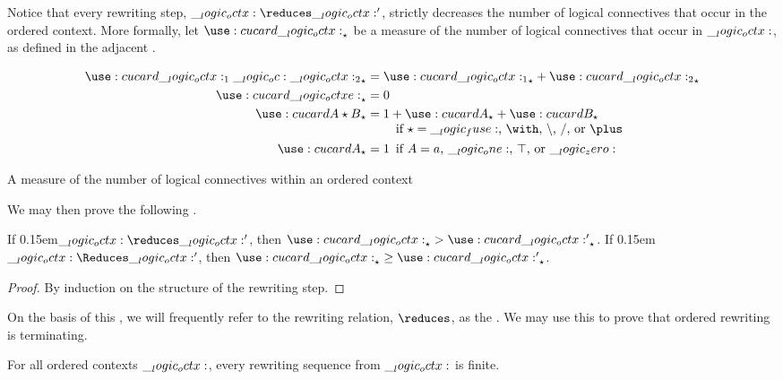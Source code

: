 Notice that every rewriting step, $\octx \reduces \octx'$, strictly decreases the number of logical connectives that occur in the ordered context.
More formally, let $\card{\octx}_{\star}$ be a measure of the number of logical connectives that occur in $\__logic_octx:$, as defined in the adjacent .
%
\begin{marginfigure}
  \begin{align*}
    \card{\octx_1 \oc \octx_2}_{\star} &= \card{\octx_1}_{\star} + \card{\octx_2}_{\star} \\
    \card{\octxe}_{\star} &= 0 \\
    \card{A \star B}_{\star} &= \begin{tabular}[t]{@{}l@{}}
                          $1 + \card{A}_{\star} + \card{B}_{\star}$ \\
                          \quad if $\mathord{\star} = \mathord{\fuse}$, $\mathord{\with}$, $\mathord{\limp}$, $\mathord{\pmir}$, or $\mathord{\plus}$
                         \end{tabular} \\
    \card{A}_{\star} &= \mathrlap{1}
                    \quad \text{if $A = a$, $\one$, $\top$, or $\zero$}
  \end{align*}
  \caption{A measure of the number of logical connectives within an ordered context}\label{fig:ordered-rewriting:measure}
\end{marginfigure}%
%
We may then prove the following .%
%
\begin{lemma}\label{lem:ordered-rewriting:reduction}
  If \kern0.15em$\octx \reduces \octx'$, then $\card{\octx}_{\star} > \card{\octx'}_{\star}$.
  If \kern0.15em$\octx \Reduces \octx'$, then $\card{\octx}_{\star} \geq \card{\octx'}_{\star}$.
\end{lemma}
%
\begin{proof}
  By induction on the structure of the rewriting step.
\end{proof}
%
\noindent
On the basis of this , we will frequently refer to the rewriting relation, $\reduces$, as the .
We may use this  to prove that ordered rewriting is terminating.
% 
%
\begin{theorem}[Termination]\label{thm:ordered-rewriting:termination}
  For all ordered contexts $\__logic_octx:$, every rewriting sequence from $\__logic_octx:$ is finite.
\end{theorem}
